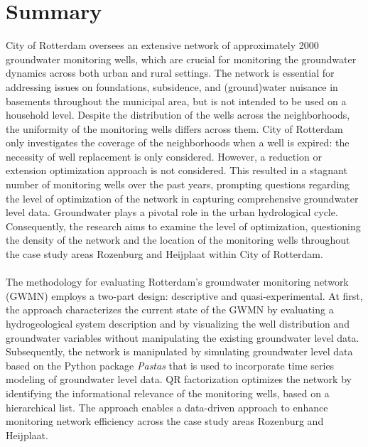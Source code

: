 \chapter*{Summary}

City of Rotterdam oversees an extensive network of approximately 2000 groundwater monitoring wells, which are crucial for monitoring the groundwater dynamics across both urban and rural settings. The network is essential for addressing issues on foundations, subsidence, and (ground)water nuisance in basements throughout the municipal area, but is not intended to be used on a household level. Despite the distribution of the wells across the neighborhoods, the uniformity of the monitoring wells differs across them. City of Rotterdam only investigates the coverage of the neighborhoods when a well is expired: the necessity of well replacement is only considered. However, a reduction or extension optimization approach is not considered. This resulted in a stagnant number of monitoring wells over the past years, prompting questions regarding the level of optimization of the network in capturing comprehensive groundwater level data. Groundwater plays a pivotal role in the urban hydrological cycle. Consequently, the research aims to examine the level of optimization, questioning the density of the network and the location of the monitoring wells throughout the case study areas Rozenburg and Heijplaat within City of Rotterdam.\\
\\
The methodology for evaluating Rotterdam’s groundwater monitoring network (GWMN) employs a two-part design: descriptive and quasi-experimental. At first, the approach characterizes the current state of the GWMN by evaluating a hydrogeological system description and by visualizing the well distribution and groundwater variables without manipulating the existing groundwater level data. Subsequently, the network is manipulated by simulating groundwater level data based on the Python package \textit{Pastas }that is used to incorporate time series modeling of groundwater level data. QR factorization optimizes the network by identifying the informational relevance of the monitoring wells, based on a hierarchical list. The approach enables a data-driven approach to enhance monitoring network efficiency across the case study areas Rozenburg and Heijplaat.\\
\\
